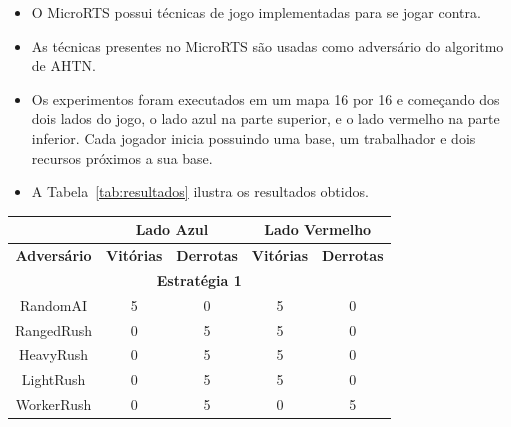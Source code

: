 \documentclass[a0,portrait]{a0poster}
\newcommand\itemadjust{\itemsep.5em \parskip0pt \parsep0pt}
\begin{document}
\begin{multicols}{2}
	\begin{itemize}
		\item O MicroRTS possui técnicas de jogo implementadas para se jogar contra.
		\item As técnicas presentes no MicroRTS são usadas como adversário do algoritmo de AHTN. 
		\item Os experimentos foram executados em um mapa 16 por 16 e começando dos dois lados do jogo, o lado azul na parte superior, e o lado vermelho na parte inferior. Cada jogador inicia possuindo uma base, um trabalhador e dois recursos próximos a sua base.
		\item A Tabela~\ref{tab:resultados} ilustra os resultados obtidos.
	\end{itemize}
	
	\vspace{8mm}
	{\large
		\begin{center}
			\begin{tabular}{|c|cc|cc|}
				\hline
				\textbf{}           & \multicolumn{2}{c|}{\textbf{Lado Azul}}                    & \multicolumn{2}{c|}{\textbf{Lado Vermelho}}                \\ \hline
				\textbf{Adversário} & \multicolumn{1}{c|}{\textbf{Vitórias}} & \textbf{Derrotas} & \multicolumn{1}{c|}{\textbf{Vitórias}} & \textbf{Derrotas} \\ \hline
				\multicolumn{5}{|c|}{\textbf{Estrat\'egia 1}}                                                                                                   \\ \hline
				RandomAI              & 5                                      & 0                 & 5                                      & 0                 \\
				RangedRush              & 0                                      & 5                 & 5                                      & 0                 \\
				HeavyRush               & 0                                      & 5                 & 5                                      & 0                 \\
				LightRush               & 0                                      & 5                 & 5                                      & 0                 \\
				WorkerRush              & 0                                      & 5                 & 0                                      & 5                 \\ \hline

\end{tabular}
\end{center}}
\end{multicols}
\end{document}
